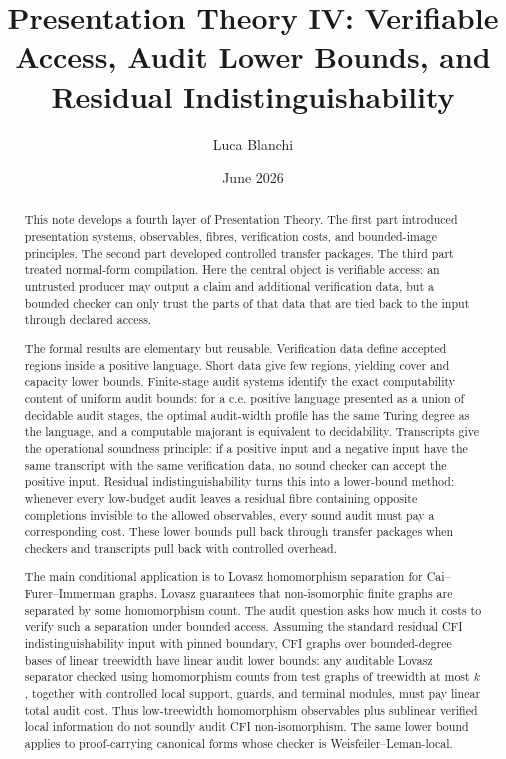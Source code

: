 \documentclass[11pt]{article}
\title{Presentation Theory IV: Verifiable Access, Audit Lower Bounds, and Residual Indistinguishability}
\author{Luca Blanchi}
\date{June 2026}
\theoremstyle{definition}
\begin{document}
\maketitle

\begin{abstract}
This note develops a fourth layer of Presentation Theory. The first part introduced presentation systems, observables, fibres, verification costs, and bounded-image principles. The second part developed controlled transfer packages. The third part treated normal-form compilation. Here the central object is verifiable access: an untrusted producer may output a claim and additional verification data, but a bounded checker can only trust the parts of that data that are tied back to the input through declared access.

The formal results are elementary but reusable. Verification data define accepted regions inside a positive language. Short data give few regions, yielding cover and capacity lower bounds. Finite-stage audit systems identify the exact computability content of uniform audit bounds: for a c.e. positive language presented as a union of decidable audit stages, the optimal audit-width profile has the same Turing degree as the language, and a computable majorant is equivalent to decidability. Transcripts give the operational soundness principle: if a positive input and a negative input have the same transcript with the same verification data, no sound checker can accept the positive input. Residual indistinguishability turns this into a lower-bound method: whenever every low-budget audit leaves a residual fibre containing opposite completions invisible to the allowed observables, every sound audit must pay a corresponding cost. These lower bounds pull back through transfer packages when checkers and transcripts pull back with controlled overhead.

The main conditional application is to Lovasz homomorphism separation for Cai--Furer--Immerman graphs. Lovasz guarantees that non-isomorphic finite graphs are separated by some homomorphism count. The audit question asks how much it costs to verify such a separation under bounded access. Assuming the standard residual CFI indistinguishability input with pinned boundary, CFI graphs over bounded-degree bases of linear treewidth have linear audit lower bounds: any auditable Lovasz separator checked using homomorphism counts from test graphs of treewidth at most \(k\), together with controlled local support, guards, and terminal modules, must pay linear total audit cost. Thus low-treewidth homomorphism observables plus sublinear verified local information do not soundly audit CFI non-isomorphism. The same lower bound applies to proof-carrying canonical forms whose checker is Weisfeiler--Leman-local.
\end{abstract}
\end{document}
